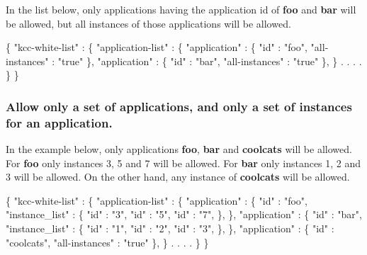 In the list below, only applications having the application id of {\bfseries foo} and {\bfseries bar} will be allowed, but all instances of those applications will be allowed. 
\begin{DoxyCode}
\{
  \textcolor{stringliteral}{"kcc-white-list"} : \{
    \textcolor{stringliteral}{"application-list"} : \{
      \textcolor{stringliteral}{"application"} : \{
        \textcolor{stringliteral}{"id"}            : \textcolor{stringliteral}{"foo"},
        \textcolor{stringliteral}{"all-instances"} : \textcolor{stringliteral}{"true"}
      \},
      \textcolor{stringliteral}{"application"} : \{
        \textcolor{stringliteral}{"id"}            : \textcolor{stringliteral}{"bar"},
        \textcolor{stringliteral}{"all-instances"} : \textcolor{stringliteral}{"true"}
      \},
    \}
    .
    .
    .
    .
  \}
\}
\end{DoxyCode}


\subsubsection*{Allow only a set of applications, and only a set of instances for an application.}

In the example below, only applications {\bfseries foo}, {\bfseries bar} and {\bfseries coolcats} will be allowed. For {\bfseries foo} only instances 3, 5 and 7 will be allowed. For {\bfseries bar} only instances 1, 2 and 3 will be allowed. On the other hand, any instance of {\bfseries coolcats} will be allowed. 
\begin{DoxyCode}
\{
  \textcolor{stringliteral}{"kcc-white-list"} : \{
    \textcolor{stringliteral}{"application-list"} : \{
      \textcolor{stringliteral}{"application"} : \{
        \textcolor{stringliteral}{"id"}            : \textcolor{stringliteral}{"foo"},
        \textcolor{stringliteral}{"instance\_list"} : \{
          \textcolor{stringliteral}{"id"} : \textcolor{stringliteral}{"3"},
          \textcolor{stringliteral}{"id"} : \textcolor{stringliteral}{"5"},
          \textcolor{stringliteral}{"id"} : \textcolor{stringliteral}{"7"},
        \},
      \},
      \textcolor{stringliteral}{"application"} : \{
        \textcolor{stringliteral}{"id"}            : \textcolor{stringliteral}{"bar"},
        \textcolor{stringliteral}{"instance\_list"} : \{
          \textcolor{stringliteral}{"id"} : \textcolor{stringliteral}{"1"},
          \textcolor{stringliteral}{"id"} : \textcolor{stringliteral}{"2"},
          \textcolor{stringliteral}{"id"} : \textcolor{stringliteral}{"3"},
        \},
      \},
      \textcolor{stringliteral}{"application"} : \{
        \textcolor{stringliteral}{"id"}            : \textcolor{stringliteral}{"coolcats"},
        \textcolor{stringliteral}{"all-instances"} : \textcolor{stringliteral}{"true"}
      \},
    \}
    .
    .
    .
    .
  \}
\}
\end{DoxyCode}


